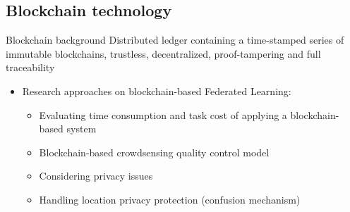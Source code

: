 \subsection{Blockchain technology}

\begin{frame}{Blockchain background}
  \alert{Distributed ledger containing a time-stamped series of immutable blockchains, trustless, decentralized, proof-tampering and full traceability}
  \begin{itemize}
    \item Research approaches on blockchain-based Federated Learning:
          \begin{itemize}
            \item Evaluating time consumption and task cost of applying a blockchain-based system\cite{paper33}
            \item Blockchain-based crowdsensing quality control model\cite{paper34}
            \item Considering privacy issues\cite{paper35}
            \item Handling location privacy protection\cite{paper37} (confusion mechanism)
          \end{itemize}
  \end{itemize}
\end{frame}